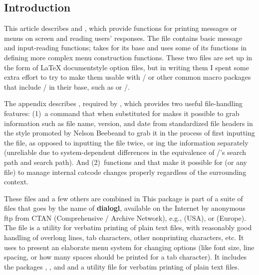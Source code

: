 \begin{multicols}{2}
\section*{Introduction}

\ifall
This article describes
 and , which
provide functions for printing messages or menus on screen and reading
users' responses. The file  contains basic message and
input-reading functions;  takes  for its
base and uses some of its functions in defining more complex menu
construction functions. These two files are set up in the form of
\LaTeX{} documentstyle option files, but in writing them I spent some
extra effort to try to make them usable with \plaintex/ or other
common macro packages that include \plaintex/ in their base, such as
\AmSTeX{} or \eplain/.

The appendix describes , required by ,
which provides two useful file-handling features: (1)~a command
 that when substituted for  makes it possible to
grab information such as file name, version, and date from standardized
file headers in the style promoted by Nelson Beebe\Dash and to grab it
in the process of first inputting the file, as opposed to inputting the
file twice, or ing the information separately (unreliable due
to system-dependent differences in the equivalence of \tex/'s 
search path and  search path). And (2)~functions
 and  that make it possible for
 (or any file) to manage internal catcode changes
properly regardless of the surrounding context.

These files and a few others are combined in
\else
This package is part of
\fi
a suite of files that goes
by the name of {\bf dialogl}, available on the Internet by anonymous ftp
from CTAN (Comprehensive \tex/ Archive Network), e.g., 
(USA), or  (Europe).
%
\ifall
The file  is a utility for verbatim printing of plain
text files, with reasonably good handling of overlong lines, tab
characters, other nonprinting characters, etc. It uses  to
present an elaborate menu system for changing options (like font size,
line spacing, or how many spaces should be printed for a tab character).
\else
It includes the packages , , and 
and a utility file  for verbatim printing of plain text
files.
\fi


\end{multicols}
